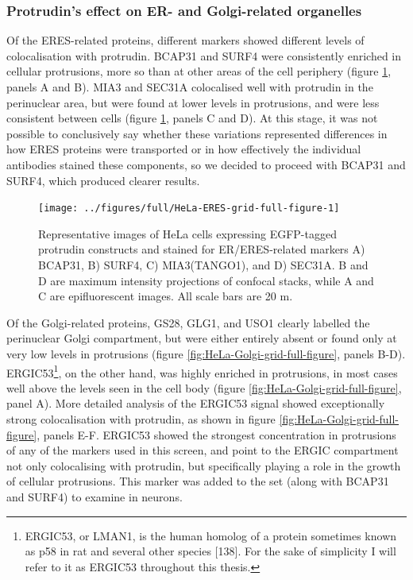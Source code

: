 \documentclass[
  12pt,
  a4paper,
]{book}
\begin{document}
\subsubsection{Protrudin's effect on ER- and Golgi-related organelles}\label{protrudins-effect-on-er--and-golgi-related-organelles}

Of the ERES-related proteins, different markers showed different levels of colocalisation with protrudin. BCAP31 and SURF4 were consistently enriched in cellular protrusions, more so than at other areas of the cell periphery (figure \ref{fig:HeLa-ERES-grid-full-figure}, panels A and B). MIA3 and SEC31A colocalised well with protrudin in the perinuclear area, but were found at lower levels in protrusions, and were less consistent between cells (figure \ref{fig:HeLa-ERES-grid-full-figure}, panels C and D). At this stage, it was not possible to conclusively say whether these variations represented differences in how ERES proteins were transported or in how effectively the individual antibodies stained these components, so we decided to proceed with BCAP31 and SURF4, which produced clearer results.

\begin{figure}
\texttt{[image: ../figures/full/HeLa-ERES-grid-full-figure-1]} \caption[Protrudin-expressing HeLa cells stained for BCAP31, SURF4, MIA3, and SEC31A]{Representative images of HeLa cells expressing EGFP-tagged protrudin constructs and stained for ER/ERES-related markers A) BCAP31, B) SURF4, C) MIA3(TANGO1), and D) SEC31A.  B and D are maximum intensity projections of confocal stacks, while A and C are epifluorescent images.  All scale bars are 20 \textmu{}m.}\label{fig:HeLa-ERES-grid-full-figure}
\end{figure}

Of the Golgi-related proteins, GS28, GLG1, and USO1 clearly labelled the perinuclear Golgi compartment, but were either entirely absent or found only at very low levels in protrusions (figure \ref{fig:HeLa-Golgi-grid-full-figure}, panels B-D). ERGIC53\footnote{ERGIC53, or LMAN1, is the human homolog of a protein sometimes known as p58 in rat and several other species {[}138{]}. For the sake of simplicity I will refer to it as ERGIC53 throughout this thesis.}, on the other hand, was highly enriched in protrusions, in most cases well above the levels seen in the cell body (figure \ref{fig:HeLa-Golgi-grid-full-figure}, panel A). More detailed analysis of the ERGIC53 signal showed exceptionally strong colocalisation with protrudin, as shown in figure \ref{fig:HeLa-Golgi-grid-full-figure}, panels E-F. ERGIC53 showed the strongest concentration in protrusions of any of the markers used in this screen, and point to the ERGIC compartment not only colocalising with protrudin, but specifically playing a role in the growth of cellular protrusions. This marker was added to the set (along with BCAP31 and SURF4) to examine in neurons.
\end{document}
